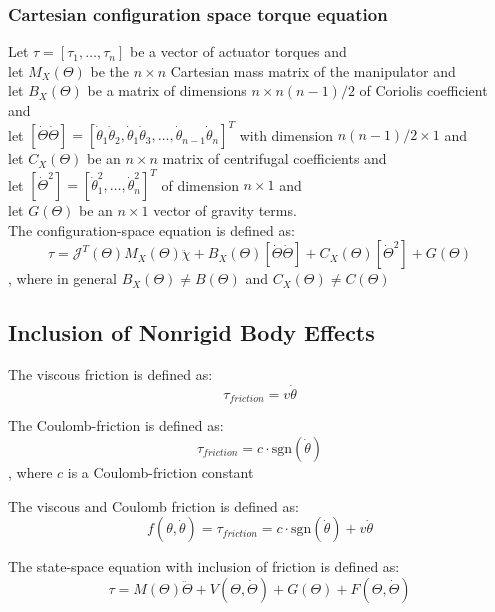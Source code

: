 \documentclass[10pt,a4paper]{article}
\begin{document}
\subsubsection{Cartesian configuration space torque equation}
Let $\tau = [\tau_1, \dots, \tau_n]$ be a vector of actuator torques and \\
let $M_X(\Theta)$ be the $n \times n$ Cartesian mass matrix of the manipulator and \\
let $B_X(\Theta)$ be a matrix of dimensions $n \times n(n-1)/2$ of Coriolis coefficient and \\
let $[\dot{\Theta}\dot{\Theta}] = [\dot \theta_1 \dot \theta_2, \dot \theta_1 \dot \theta_3, \dots, \dot \theta_{n-1}\dot \theta_n]^T$ with dimension $n(n-1)/2 \times 1$ and \\
let $C_X(\Theta)$ be an $n \times n$ matrix of centrifugal coefficients and \\
let $[\dot \Theta^2] = [\dot \theta_1^2, \dots, \dot \theta_n^2]^T$ of dimension $n \times 1$ and \\
let $G(\Theta)$ be an $n \times 1$ vector of gravity terms. \\
The configuration-space equation is defined as: \\
$$
	\tau = \mathcal{J}^T(\Theta)M_X(\Theta)\ddot{\chi} + B_X(\Theta)[\dot \Theta \dot \Theta] + C_X(\Theta)[\dot \Theta^2] + G(\Theta)
$$
, where in general $B_X(\Theta) ≠ B(\Theta)$ and $C_X(\Theta) ≠ C(\Theta)$

\subsection{Inclusion of Nonrigid Body Effects}
The viscous friction is defined as:
$$
	\tau_{friction} = v \dot \theta
$$

The Coulomb-friction is defined as:
$$
	\tau_{friction} = c ⋅ \textrm{sgn}(\dot \theta)
$$
, where $c$ is a Coulomb-friction constant

The viscous and Coulomb friction is defined as:
$$
f(\theta, \dot \theta) = \tau_{friction} = c ⋅ \textrm{sgn}(\dot \theta) + v \dot \theta
$$

The state-space equation with inclusion of friction is defined as: \\
$$
\tau = M(\Theta)\ddot{\Theta} + V(\Theta, \dot{\Theta}) + G(\Theta) + F(\Theta, \dot \Theta)
$$
\end{document}
